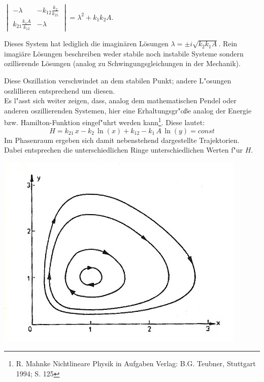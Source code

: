 \documentclass[11pt]{article}
\begin{document}
$\begin{vmatrix} -\lambda & -k_{12}\frac{k_2}{k_21} \\ k_{21}\frac{k_1 A}{k_12} & -\lambda \end{vmatrix}=\lambda^2+k_1k_2A$.\\
\vspace{3mm}

Dieses System hat lediglich die imaginären Lösungen $\lambda=\pm i\sqrt{k_2k_1A}$. Rein imagiäre Lösungen beschreiben weder stabile noch instabile Systeme sondern ozillierende Lösungen (analog zu Schwingungsgleichungen in der Mechanik).

\begin{minipage}[b]{0.6\linewidth}
Diese Oszillation verschwindet an dem stabilen Punkt; andere L"osungen oszlillieren entsprechend um diesen.\\
Es l"asst sich weiter zeigen, dass, analog dem mathematischen Pendel oder anderen oszillierenden Systemen, hier eine Erhaltungsgr"o\ss e analog der Energie bzw. Hamilton-Funktion eingef"uhrt werden kann\footnote{R. Mahnke \glqq Nichtlineare Physik in Aufgaben \grqq Verlag: B.G. Teubner, Stuttgart 1994; S. 125}. Diese lautet:
$$H=k_{21}\,x-k_2\,\ln(x)+k_{12}-k_1\,A\,\ln(y)=const$$
Im Phasenraum ergeben sich damit nebenstehend dargestellte Trajektorien. Dabei entsprechen die unterschiedlichen Ringe unterschiedlichen Werten f"ur $H$.
\end{minipage}
\begin{minipage}[b]{0.4\linewidth}
\includegraphics[width=\textwidth]{Bilder/Hamdyn.jpg}
\end{minipage}
\end{document}
